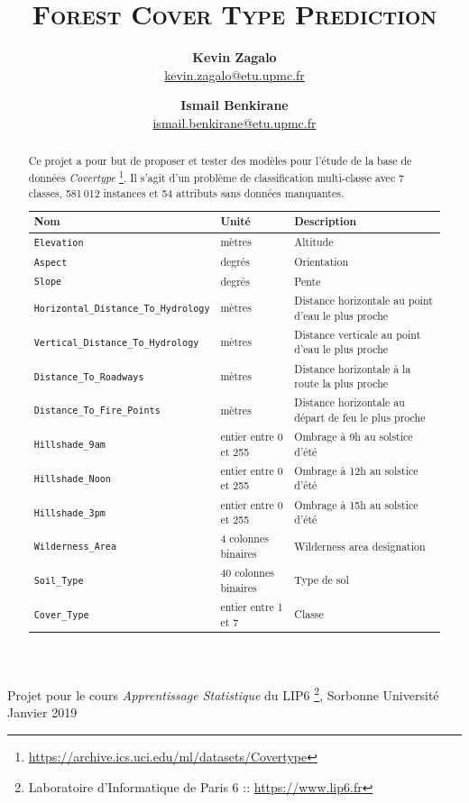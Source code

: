 \documentclass[12pt,a4paper]{article}
\title{\scshape \huge Forest Cover Type Prediction}
\author{\textbf{Kevin Zagalo} \\  \url{kevin.zagalo@etu.upmc.fr}  \and \textbf{Ismail Benkirane} \\ \url{ismail.benkirane@etu.upmc.fr}}
\date{}
\numberwithin{equation}{section}
\newcommand{\elevation}{\texttt{Elevation}}
\newcommand{\aspect}{\texttt{Aspect}}
\newcommand{\slope}{\texttt{Slope}}
\newcommand{\hhydro}{\texttt{Horizontal\_Distance\_To\_Hydrology}}
\newcommand{\vhydro}{\texttt{Vertical\_Distance\_To\_Hydrology}}
\newcommand{\roadways}{\texttt{Distance\_To\_Roadways}}
\newcommand{\hilshadeM}{\texttt{Hillshade\_9am}}
\newcommand{\hilshadeN}{\texttt{Hillshade\_Noon}}
\newcommand{\hilshadeA}{\texttt{Hillshade\_3pm}}
\newcommand{\fire}{\texttt{Distance\_To\_Fire\_Points}}
\newcommand{\wilderness}{\texttt{Wilderness\_Area}}
\newcommand{\soil}{\texttt{Soil\_Type}}
\newcommand{\cover}{\texttt{Cover\_Type}}
\begin{document}
	
	\maketitle
	
	{\small Projet pour le cours \textit{Apprentissage Statistique} du LIP6 \footnote[0]{Laboratoire d'Informatique de Paris 6 :: \url{https://www.lip6.fr}}, Sorbonne Université} \hfill Janvier 2019
	
	\hrulefill
	
	\begin{abstract}
		Ce projet a pour but de proposer et tester des modèles pour l'étude de la base de données  \textit{Covertype} \footnote{\url{https://archive.ics.uci.edu/ml/datasets/Covertype}}. Il s'agit d'un problème de classification multi-classe avec 7 classes, 581\,012 instances et 54 attributs sans données manquantes.\\
		
		\begin{flushleft}
			\begin{tabular}{l l p{5.2cm}}
				Nom & Unité & Description \\
				\hline
				\elevation & mètres & Altitude \\ 
				\aspect & degrés & Orientation \\ 
				\slope & degrés & Pente \\
				\hhydro & mètres & Distance horizontale au point d’eau le plus proche\\
				\vhydro & mètres & Distance verticale au point d’eau le plus proche \\
				\roadways & mètres & Distance horizontale à la route la plus proche \\
				\fire & mètres & Distance horizontale au départ de feu le plus proche\\
				\hilshadeM & entier entre 0 et 255 & Ombrage à 9h au solstice d’été \\
				\hilshadeN & entier entre 0 et 255 & Ombrage à 12h au solstice d'été\\
				\hilshadeA & entier entre 0 et 255 &  Ombrage à 15h au solstice d'été \\
				\wilderness & 4 colonnes binaires & Wilderness area designation \\
				\soil & 40 colonnes binaires & Type de sol\\
				\cover & entier entre 1 et 7 & Classe\\
			\end{tabular}
		\end{flushleft}
	\end{abstract}
	
\end{document}
